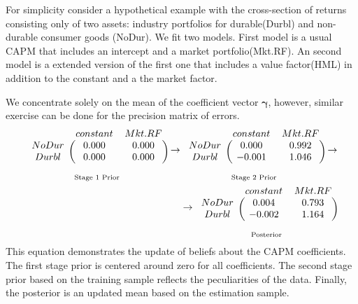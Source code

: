 For simplicity consider a hypothetical example with the cross-section of returns consisting only of  two assets: industry portfolios for durable(Durbl) and non-durable consumer goods (NoDur).
We fit two models.
First model is a usual CAPM that includes an intercept and a market portfolio(Mkt.RF). 
An second model is a extended version of the first one that includes a value factor(HML) in addition to the constant and a the market factor. 

We concentrate solely on the mean of the coefficient vector $\boldsymbol{\gamma}$, however, similar exercise can be done for the precision matrix of errors.
\begin{eqnarray*}
\underset{\text{Stage 1 Prior}}
{\begin{blockarray}{ccc}
	& constant & Mkt.RF  \\ 
	\begin{block}{c(cc)}
	NoDur & 0.000 & 0.000 \\ 
	Durbl & 0.000 & 0.000 \\ 
	\end{block}
\end{blockarray} }
\rightarrow
\underset{\text{Stage 2 Prior}}
{\begin{blockarray}{ccc}
	& constant & Mkt.RF \\ 
	\begin{block}{c(cc)}
	NoDur & 0.000 & 0.992 \\ 
	Durbl & -0.001 & 1.046 \\ 
	\end{block}
\end{blockarray} }
\rightarrow \\
\rightarrow
\underset{\text{Posterior}}
{\begin{blockarray}{ccc}
	& constant & Mkt.RF \\ 
	\begin{block}{c(cc)}
	NoDur & 0.004 & 0.793 \\ 
	Durbl & -0.002 & 1.164 \\ 
	\end{block}
\end{blockarray}}
\end{eqnarray*}
This equation demonstrates the update of beliefs about the CAPM coefficients.
The first stage prior is centered around zero for all coefficients. 
The second stage prior based on the training sample reflects the peculiarities of the data. 
Finally, the posterior is an updated mean based on the estimation sample. 
